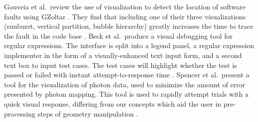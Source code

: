 Gouveia et al.\ review the use of visualization to detect the location of software faults using GZoltar \cite{campos2012gzoltar}. They find that including one of their three visualizations (sunburst, vertical partition, bubble hierarchy) greatly increases the time to trace the fault in the code base \cite{gouveia2013using}.
Beck et al.\ produce a visual debugging tool for regular expressions. The interface is split into a legend panel, a regular expression implementer in the form of a visually-enhanced text input form, and a second text box to input test cases. The test cases will highlight whether the test is passed or failed with instant attempt-to-response time \cite{beck2014regviz}.
Spencer et al.\ present a tool for the visualization of photon data, used to minimize the amount of error presented by photon mapping. This tool is used to rapidly attempt trials with a quick visual response, differing from our concepts which aid the user in pre-processing steps of geometry manipulation \cite{spencer2015visualization}. 



